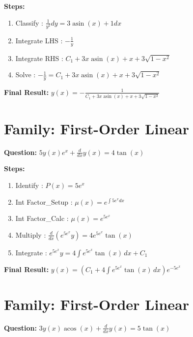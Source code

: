 \documentclass{article}
\begin{document}
\textbf{Steps:}
\begin{enumerate}
\item Classify :  $\frac{1}{y^{2}} dy = 3 \operatorname{asin}{\left(x \right)} + 1 dx$
\item Integrate LHS :  $- \frac{1}{y}$
\item Integrate RHS :  $C_{1} + 3 x \operatorname{asin}{\left(x \right)} + x + 3 \sqrt{1 - x^{2}}$
\item Solve :  $- \frac{1}{y} = C_{1} + 3 x \operatorname{asin}{\left(x \right)} + x + 3 \sqrt{1 - x^{2}}$
\end{enumerate}
\textbf{Final Result:} $y{\left(x \right)} = - \frac{1}{C_{1} + 3 x \operatorname{asin}{\left(x \right)} + x + 3 \sqrt{1 - x^{2}}}$

\section*{Family: First-Order Linear}
\textbf{Question:} $5 y{\left(x \right)} e^{x} + \frac{d}{d x} y{\left(x \right)} = 4 \tan{\left(x \right)}$

\textbf{Steps:}
\begin{enumerate}
\item Identify :  $P(x) = 5 e^{x}$
\item Int Factor_Setup :  $\mu(x) = e^{\int 5 e^{x} dx}$
\item Int Factor_Calc :  $\mu(x) = e^{5 e^{x}}$
\item Multiply :  $\frac{d}{dx}(e^{5 e^{x}}y) = 4 e^{5 e^{x}} \tan{\left(x \right)}$
\item Integrate :  $e^{5 e^{x}}y = 4 \int e^{5 e^{x}} \tan{\left(x \right)}\, dx + C_1$
\end{enumerate}
\textbf{Final Result:} $y{\left(x \right)} = \left(C_{1} + 4 \int e^{5 e^{x}} \tan{\left(x \right)}\, dx\right) e^{- 5 e^{x}}$

\section*{Family: First-Order Linear}
\textbf{Question:} $3 y{\left(x \right)} \operatorname{acos}{\left(x \right)} + \frac{d}{d x} y{\left(x \right)} = 5 \tan{\left(x \right)}$
\end{document}
